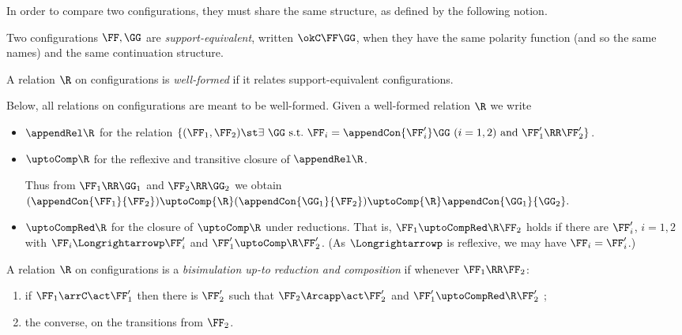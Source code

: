 In order to compare two configurations,
they must share the same structure, as defined by the following notion.
\begin{definition}
\label{d:compa}
Two configurations $\FF,\GG$ are \emph{support-equivalent}, written 
$\okC \FF\GG$, when they have the same polarity function (and so the same names) and the
same continuation structure.

\noindent
A relation $\R$ on configurations is \emph{well-formed} if it relates
support-equivalent configurations. 
\end{definition} 

\noindent
Below, all relations on configurations are meant to be well-formed. 
Given a well-formed relation $\R$ we write
\begin{itemize}
\item $\appendRel \R $ for the relation
$
\{ (\FF_1,\FF_2) \st
\mbox{$\exists$ $\GG$ s.t.\ }
 \FF_i = \appendCon{\FF'_i}\GG \mbox{ ($i=1,2$)}  \mbox{ and } 
 \FF'_1\RR \FF'_2\}
$.
\item
$\uptoComp \R $ for the reflexive and transitive closure of 
$\appendRel \R $.

Thus from $\FF_1 \RR  
\GG_1$ and  $\FF_2 \RR
\GG_2$ we obtain 
$(\appendCon{\FF_1}{\FF_2})  \uptoComp{\R}   
(\appendCon{\GG_1}{\FF_2}) \uptoComp{\R}  \appendCon{\GG_1}{\GG_2}.$



\item 
$\uptoCompRed \R $ for the closure of $\uptoComp \R $ under
reductions. That is, $\FF_1 \uptoCompRed \R \FF_2$ holds if there are 
$\FF_i'$, $i=1,2$ with $\FF_i \Longrightarrowp \FF'_i$ and 
$\FF_1' \uptoComp \R \FF_2'$.
(As $\Longrightarrowp$ is reflexive, we may have $\FF_i =
\FF'_i$.) 
\end{itemize}
 
\begin{definition}
\label{d:uptoComp}
A relation $\R$ on configurations is a \emph{bisimulation up-to
 reduction and   composition } if whenever $\FF_1 \RR \FF_2$: 
\begin{enumerate}
\item
 if $\FF_1 \arrC\act \FF_1'  $ then there is $\FF_2' $ such that 
$\FF_2 \Arcapp\act \FF_2'  $ and 
$\FF'_1 \uptoCompRed \R \FF'_2$ ;

\item the converse, on the transitions from  $\FF_2$.
\end{enumerate}
\end{definition}



